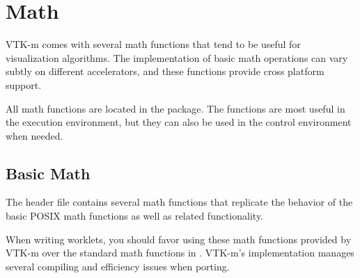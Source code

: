 
\chapter{Math}
\label{chap:Math}


VTK-m comes with several math functions that tend to be useful for
visualization algorithms. The implementation of basic math operations can
vary subtly on different accelerators, and these functions provide cross
platform support.

All math functions are located in the \vtkm{} package. The functions are
most useful in the execution environment, but they can also be used in the
control environment when needed.

\section{Basic Math}

The  header file contains several math functions
that replicate the behavior of the basic POSIX math functions as well as
related functionality.

\begin{didyouknow}
  When writing worklets, you should favor using these math functions
  provided by VTK-m over the standard math functions in
  . VTK-m's implementation manages several compiling
  and efficiency issues when porting.
\end{didyouknow}

